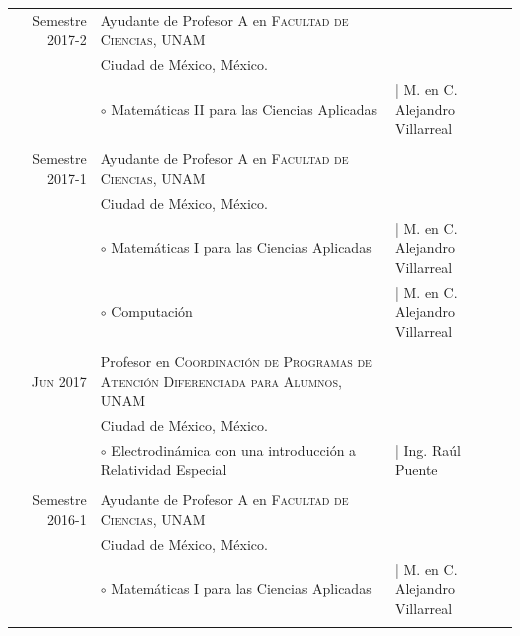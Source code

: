 \documentclass[a4paper,10pt]{article} %
\begin{document}
\begin{tabular}{r|p{7.8cm}p{4cm}}
Semestre 2017-2 & Ayudante de Profesor A en \textsc{Facultad de Ciencias, UNAM} &\\
&\small Ciudad de México, México. & \\
& \footnotesize $\circ$ Matemáticas II para las Ciencias Aplicadas & | {\footnotesize M. en C. Alejandro Villarreal}\\
\multicolumn{3}{c}{} \\


Semestre 2017-1 & Ayudante de Profesor A en \textsc{Facultad de Ciencias, UNAM} &\\
&\small Ciudad de México, México. & \\
& \footnotesize $\circ$ Matemáticas I para las Ciencias Aplicadas & | {\footnotesize M. en C. Alejandro Villarreal}\\
& \footnotesize $\circ$ Computación & | {\footnotesize M. en C. Alejandro Villarreal}\\
\multicolumn{3}{c}{} \\

\textsc{Jun 2017} & Profesor en \textsc{Coordinación de Programas de Atención Diferenciada para Alumnos, UNAM} &\\
& \small Ciudad de México, México. & \\
& \footnotesize $\circ$ Electrodinámica con una introducción a Relatividad Especial & | {\footnotesize Ing. Raúl Puente}\\
\multicolumn{3}{c}{} \\


Semestre 2016-1 & Ayudante de Profesor A en \textsc{Facultad de Ciencias, UNAM} &\\
& \small Ciudad de México, México. & \\
& \footnotesize $\circ$ Matemáticas I para las Ciencias Aplicadas & | {\footnotesize M. en C. Alejandro Villarreal}\\
\multicolumn{3}{c}{} \\
\end{tabular}

\end{document}
